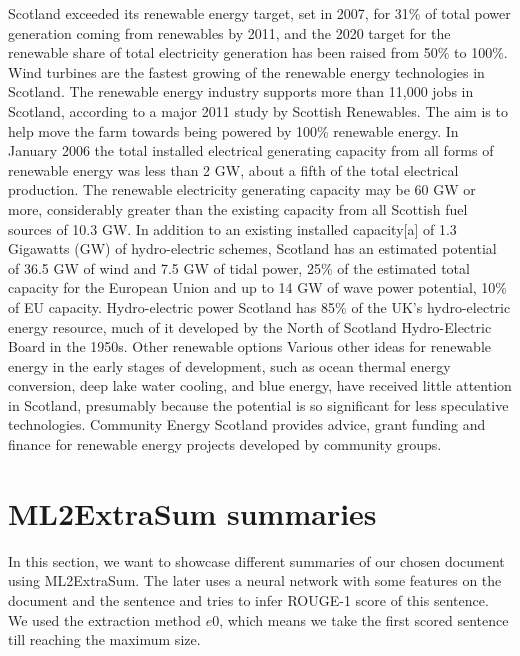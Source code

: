 \begin{tcolorbox}\footnotesize
	Scotland exceeded its renewable energy target, set in 2007, for 31\% of total power generation coming from renewables by 2011, and the 2020 target for the renewable share of total electricity generation has been raised from 50\% to 100\%.
	Wind turbines are the fastest growing of the renewable energy technologies in Scotland.
	The renewable energy industry supports more than 11,000 jobs in Scotland, according to a major 2011 study by Scottish Renewables.
	The aim is to help move the farm towards being powered by 100\% renewable energy.
	In January 2006 the total installed electrical generating capacity from all forms of renewable energy was less than 2 GW, about a fifth of the total electrical production.
	The renewable electricity generating capacity may be 60 GW or more, considerably greater than the existing capacity from all Scottish fuel sources of 10.3 GW.
	In addition to an existing installed capacity[a] of 1.3 Gigawatts (GW) of hydro-electric schemes, Scotland has an estimated potential of 36.5 GW of wind and 7.5 GW of tidal power, 25\% of the estimated total capacity for the European Union and up to 14 GW of wave power potential, 10\% of EU capacity.
	Hydro-electric power Scotland has 85\% of the UK's hydro-electric energy resource, much of it developed by the North of Scotland Hydro-Electric Board in the 1950s.
	Other renewable options Various other ideas for renewable energy in the early stages of development, such as ocean thermal energy conversion, deep lake water cooling, and blue energy, have received little attention in Scotland, presumably because the potential is so significant for less speculative technologies.
	Community Energy Scotland provides advice, grant funding and finance for renewable energy projects developed by community groups.
\end{tcolorbox}

\section{ML2ExtraSum summaries}

In this section, we want to showcase different summaries of our chosen document using ML2ExtraSum.
The later uses a neural network with some features on the document and the sentence and tries to infer ROUGE-1 score of this sentence.
We used the extraction method $e0$, which means we take the first scored sentence till reaching the maximum size. 

